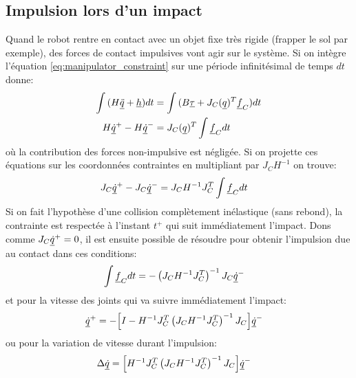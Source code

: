 \subsection{Impulsion lors d'un impact}
\label{sec:impact}
Quand le robot rentre en contact avec un objet fixe très rigide (frapper le sol par exemple), des forces de contact impulsives vont agir sur le système. Si on intègre l'équation \eqref{eq:manipulator_constraint} sur une période infinitésimal de temps $dt$ donne:
\begin{align}
\int{ ( H \underline{\ddot{q}} + \underline{h} ) dt } &= \int{ ( B \underline{\tau} + J_C( \underline{ q } )^T  \underline{f}_C ) dt } \\
H \underline{\dot{q}}^+ - H \underline{\dot{q}}^- &= J_C( \underline{ q } )^T  \int{  \underline{f}_C dt }
\label{eq:manipulator_impact}
\end{align}
où la contribution des forces non-impulsive est négligée. Si on projette ces équations sur les coordonnées contraintes en multipliant par $J_C H^{-1}$ on trouve:
\begin{align}
J_C \underline{\dot{q}}^+ - J_C \underline{\dot{q}}^- &= J_C H^{-1} J_C^T  \int{  \underline{f}_C dt }
\label{eq:manipulator_impact2}
\end{align}
Si on fait l'hypothèse d'une collision complètement inélastique (sans rebond), la contrainte est respectée à l'instant $t^+$ qui suit immédiatement l'impact. Dons comme $J_C \underline{\dot{q}}^+=0$, il est ensuite possible de résoudre pour obtenir l'impulsion due au contact dans ces conditions:
\begin{align}
\int{  \underline{f}_C dt } &= - \left( J_C H^{-1} J_C^T \right)^{-1}  J_C \underline{\dot{q}}^-
\label{eq:manipulator_impact_force}
\end{align}
et pour la vitesse des joints qui va suivre immédiatement l'impact:
\begin{align}
\underline{\dot{q}}^+ &= - \Big[ I - H^{-1} J_C^T \left( J_C H^{-1} J_C^T \right)^{-1} J_C \Big] \underline{\dot{q}}^-
\label{eq:manipulator_impact_velocity}
\end{align}
ou pour la variation de vitesse durant l'impulsion:
\begin{align}
\Delta \underline{\dot{q}} &=  \Big[ H^{-1} J_C^T \left( J_C H^{-1} J_C^T \right)^{-1} J_C \Big] \underline{\dot{q}}^-
\label{eq:manipulator_impact_velocity_delta}
\end{align}
